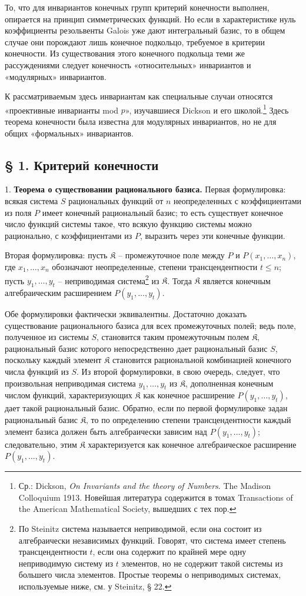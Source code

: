 \documentclass[11pt]{article}
\begin{document}
То, что для инвариантов конечных групп критерий конечности выполнен, опирается на принцип симметрических функций. Но если в характеристике нуль коэффициенты резольвенты Galois уже дают интегральный базис, то в общем случае они порождают лишь конечное подкольцо, требуемое в критерии конечности. Из существования этого конечного подкольца теми же рассуждениями следует конечность «относительных» инвариантов и «модулярных» инвариантов.

К рассматриваемым здесь инвариантам как специальные случаи относятся «проективные инварианты mod $p$», изучавшиеся Dickson и его школой.\footnote{Ср.: Dickson, \emph{On Invariants and the theory of Numbers}. The Madison Colloquium 1913. Новейшая литература содержится в томах Transactions of the American Mathematical Society, вышедших с тех пор.} Здесь теорема конечности была известна для модулярных инвариантов, но не для общих «формальных» инвариантов.

\subsection*{§ 1. Критерий конечности}

1. \textbf{Теорема о существовании рационального базиса.} Первая формулировка: всякая система $S$ рациональных функций от $n$ неопределенных с коэффициентами из поля $P$ имеет конечный рациональный базис; то есть существует конечное число функций системы такое, что всякую функцию системы можно рационально, с коэффициентами из $P$, выразить через эти конечные функции.

Вторая формулировка: пусть $\mathfrak K$ -- промежуточное поле между $P$ и $P(x_1,\ldots,x_n)$, где $x_1,\ldots,x_n$ обозначают неопределенные, степени трансцендентности $t\leq n$; пусть $y_1,\ldots,y_t$ -- неприводимая система\footnote{По Steinitz система называется неприводимой, если она состоит из алгебраически независимых функций. Говорят, что система имеет степень трансцендентности $t$, если она содержит по крайней мере одну неприводимую систему из $t$ элементов, но не содержит такой системы из большего числа элементов. Простые теоремы о неприводимых системах, используемые ниже, см. у Steinitz, § 22.} из $\mathfrak K$. Тогда $\mathfrak K$ является конечным алгебраическим расширением $P(y_1,\ldots,y_t)$.

Обе формулировки фактически эквивалентны. Достаточно доказать существование рационального базиса для всех промежуточных полей; ведь поле, полученное из системы $S$, становится таким промежуточным полем $\mathfrak K$, рациональный базис которого непосредственно дает рациональный базис $S$, поскольку каждый элемент $\mathfrak K$ становится рациональной комбинацией конечного числа функций из $S$. Из второй формулировки, в свою очередь, следует, что произвольная неприводимая система $y_1,\ldots,y_t$ из $\mathfrak K$, дополненная конечным числом функций, характеризующих $\mathfrak K$ как конечное расширение $P(y_1,\ldots,y_t)$, дает такой рациональный базис. Обратно, если по первой формулировке задан рациональный базис $\mathfrak K$, то по определению степени трансцендентности каждый элемент базиса должен быть алгебраически зависим над $P(y_1,\ldots,y_t)$; следовательно, этим $\mathfrak K$ характеризуется как конечное алгебраическое расширение $P(y_1,\ldots,y_t)$.
\end{document}
